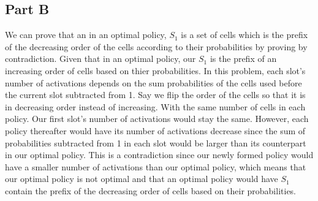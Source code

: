 \documentclass[12pt]{article}
\begin{document}
\subsection*{Part B}
We can prove that an in an optimal policy, $S_1$ is a set of cells which is the prefix of the decreasing
order of the cells according to their probabilities by proving by contradiction.
\newline
\newline
Given that in an optimal policy, our $S_1$ is the prefix of an increasing order of cells based on thier probabilities. In this problem, each slot's 
number of activations depends on the sum probabilities of the cells used before the current slot subtracted
from 1. Say we flip the order of the cells so that it is in decreasing order instead of increasing. With the 
same number of cells in each policy. Our first slot's number of activations would stay the same. However, 
each policy thereafter would have its number of activations decrease since the sum of probabilities subtracted 
from 1 in each slot would be larger than its counterpart in our optimal policy. This is a contradiction since our newly 
formed policy would have a smaller number of activations than our optimal policy, which means that our optimal policy 
is not optimal and that an optimal policy would have $S_1$ contain the prefix of the decreasing order of cells based 
on their probabilities.

\newpage
\end{document}
